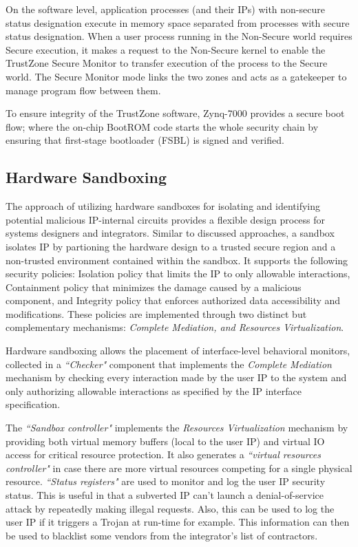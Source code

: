 \documentclass[sigconf]{acmart}
\theoremstyle{plain}
\theoremstyle{remark}
\begin{document}
On the software level, application processes (and their IPs) with non-secure status designation execute in memory space separated from processes with secure status designation. When a user process running in the Non-Secure world requires Secure execution, it makes a request to the Non-Secure kernel to enable the TrustZone Secure Monitor to transfer execution of the process to the Secure world. The Secure Monitor mode links the two zones and acts as a gatekeeper to manage program flow between them.

To ensure integrity of the TrustZone software, Zynq-7000 provides a secure boot flow; where the on-chip BootROM code starts the whole security chain by ensuring that first-stage bootloader (FSBL) is signed and verified.

\subsection{Hardware Sandboxing}\label{sec:HardwareSandbox}
The approach of utilizing hardware sandboxes for isolating and identifying potential malicious IP-internal circuits provides a flexible design process for systems designers and integrators. Similar to discussed approaches, a sandbox isolates IP by partioning the hardware design to a trusted secure region and a non-trusted environment contained within the sandbox. It supports the following security policies: Isolation policy that limits the IP to only allowable interactions, Containment policy that minimizes the damage caused by a malicious component, and Integrity policy that enforces authorized data accessibility and modifications. These policies are implemented through two distinct but complementary mechanisms: \textit{ Complete Mediation, and  Resources Virtualization}.

Hardware sandboxing allows the placement of interface-level behavioral monitors, collected in a \textit{``Checker"} component that implements the \textit{Complete Mediation} mechanism by checking every interaction made by the user IP to the system and only authorizing allowable interactions as specified by the IP interface specification.

The \textit{``Sandbox controller"} implements the \textit{Resources Virtualization} mechanism by providing both virtual memory buffers (local to the user IP) and virtual IO access for critical resource protection. It also generates a \textit{``virtual resources controller"} in case there are more virtual resources competing for a single physical resource. \textit{``Status registers"} are used to monitor and log the user IP security status. This is useful in that a subverted IP can't launch a denial-of-service attack by repeatedly making illegal requests. Also, this can be used to log the user IP if it triggers a Trojan at run-time for example. This information can then be used to blacklist some vendors from the integrator's list of contractors.
\end{document}
